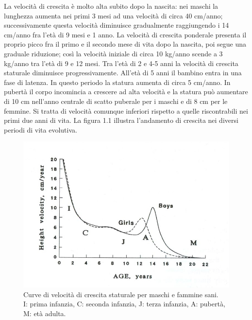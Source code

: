 La velocità di crescita è molto alta subito dopo la nascita: nei maschi la lunghezza aumenta nei primi 3 mesi ad una velocità di circa 40 cm/anno; successivamente questa velocità diminuisce gradualmente raggiungendo i 14 cm/anno fra l'età di 9 mesi e 1 anno. La velocità di crescita ponderale presenta il proprio picco fra il primo e il secondo mese di vita dopo la nascita, poi segue una graduale riduzione; così la velocità iniziale di circa 10 kg/anno scende a 3 kg/anno tra l'età di 9 e 12 mesi. Tra l'età di 2 e 4-5 anni la velocità di crescita staturale diminuisce progressivamente\cite{tanner1994growth}.
 All'età di 5 anni il bambino entra in una fase di latenza. In questo periodo la statura aumenta di circa 5 cm/anno. In pubertà il corpo incomincia a crescere ad alta velocità e la statura può aumentare di 10 cm nell'anno centrale di scatto puberale per i maschi e di 8 cm per le femmine. Si tratta di velocità comunque inferiori rispetto a quelle riscontrabili nei primi due anni di vita.
 La figura 1.1 illustra l'andamento di crescita nei diversi periodi di vita evolutiva.
 
\begin{figure}[!h]
  \begin{center}
      \includegraphics{grafici/grafico_velocita} %
  \end{center}
  \caption{Curve di velocità di crescita staturale per maschi e fammine sani.\\I: prima infanzia, C: seconda infanzia, J: terza infanzia, A: pubertà, M: età adulta. \cite{bogin1996evolution}}
  \label{fig:GraficoVelocita}
\end{figure}
 
